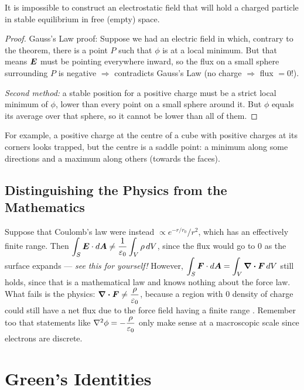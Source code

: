\begin{theorem}
It is impossible to construct an electrostatic field that will hold a charged particle in stable equilibrium in free (empty) space.
\end{theorem}

\begin{proof}
Gauss's Law proof: Suppose we had an electric field in which, contrary to the theorem, there is a point $P$ such that $\phi$ is at a local minimum. But that means $\vect{E}$ must be pointing everywhere inward, so the flux on a small sphere surrounding $P$ is negative $\Rightarrow$ contradicts Gauss's Law (no charge $\Rightarrow$ flux $= 0$!).

\textit{Second method:} a stable position for a positive charge must be a strict local minimum of $\phi$, lower than every point on a small sphere around it. But $\phi$ equals its average over that sphere, so it cannot be lower than all of them.
\end{proof}
For example, a positive charge at the centre of a cube with positive charges at its corners looks trapped, but the centre is a saddle point: a minimum along some directions and a maximum along others (towards the faces).

\subsection*{Distinguishing the Physics from the Mathematics}

Suppose that Coulomb's law were instead $\propto e^{-r/r_0}/r^2$, which has an effectively finite range. Then $\displaystyle\int_S \vect{E}\cdot d\vect{A} \neq \frac{1}{\varepsilon_0}\int_V \rho\,dV$, since the flux would go to 0 as the surface expands --- \textit{see this for yourself!} However, $\displaystyle\int_S \vect{F}\cdot d\vect{A} = \int_V \div\vect{F}\,dV$ still holds, since that is a mathematical law and knows nothing about the force law. What fails is the physics: $\div\vect{F} \neq \dfrac{\rho}{\varepsilon_0}$, because a region with 0 density of charge could still have a net flux due to the force field having a finite range . Remember too that statements like $\laplacian\phi = -\dfrac{\rho}{\varepsilon_0}$ only make sense at a macroscopic scale since electrons are discrete.

\section{Green's Identities}

